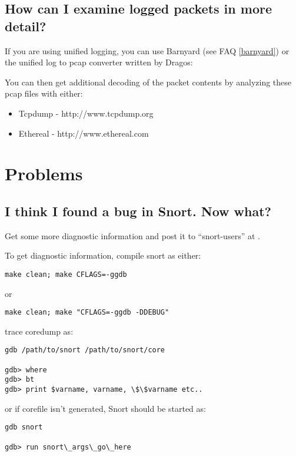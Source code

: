 \documentclass{article}
\newcommand{\myref}[1]{(see FAQ \ref{#1})}
\begin{document}
\subsection{How can I examine logged packets in more detail?}

If you are using unified logging, you can use Barnyard \myref{barnyard} or the unified log to pcap converter written by Dragos:


You can then get additional decoding of the packet contents by analyzing these
pcap files with either:
\begin{itemize}
  \item Tcpdump - http://www.tcpdump.org
  \item Ethereal - http://www.ethereal.com
\end{itemize}

\section{Problems}
\subsection{ I think I found a bug in Snort. Now what?}

Get some more diagnostic information and post it to ``snort-users'' at
.

To get diagnostic information, compile snort as either:

\begin{verbatim}make clean; make CFLAGS=-ggdb\end{verbatim}

or
\begin{verbatim}make clean; make "CFLAGS=-ggdb -DDEBUG" \end{verbatim}

trace coredump as:

\begin{verbatim}
gdb /path/to/snort /path/to/snort/core

gdb> where
gdb> bt 
gdb> print $varname, varname, \$\$varname etc..
\end{verbatim}

or if corefile isn't generated, Snort should be started as:

\begin{verbatim}
gdb snort

gdb> run snort\_args\_go\_here
\end{verbatim}
\end{document}
